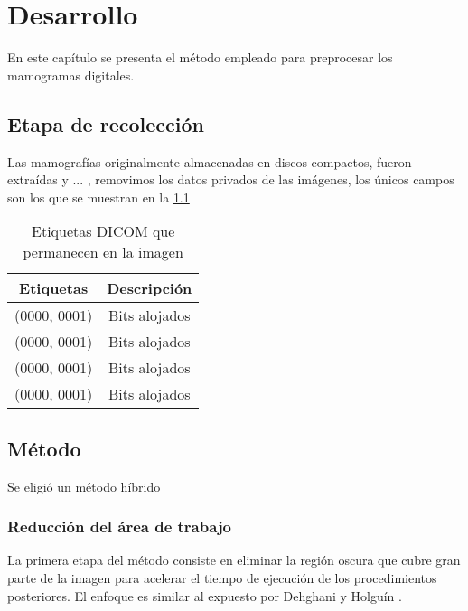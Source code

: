 \chapter{Desarrollo}
En este capítulo se presenta el método empleado para preprocesar los mamogramas
digitales.

\shorthandoff{>} %
    
\shorthandon{>} 

\section{Etapa de recolección}
Las mamografías originalmente almacenadas en discos compactos, fueron extraídas
y ... , removimos los datos privados de las imágenes, los únicos campos son los
que se muestran en la \ref{table:dicomtags} 

\begin{table}[h]
  \caption{Etiquetas DICOM que permanecen en la imagen} 
  \label{table:dicomtags}
\begin{center}
{\small
    \begin{tabular}{c|c}
    \hline

    {\bf Etiquetas} & 
    {\bf Descripción} \\
    \hline
           (0000, 0001) & Bits alojados \\
           (0000, 0001) & Bits alojados \\
           (0000, 0001) & Bits alojados \\
           (0000, 0001) & Bits alojados \\
    \hline
    \end{tabular}
}
\end{center}
\end{table}


\section{Método}
Se eligió un método híbrido

\subsection{Reducción del área de trabajo}

La primera etapa del método consiste en eliminar la región oscura que cubre
gran parte de la imagen para acelerar el tiempo de ejecución de los
procedimientos posteriores. El enfoque es similar al expuesto por Dehghani y
Holguín \cite{dehghani2011method, holguinpre}.

